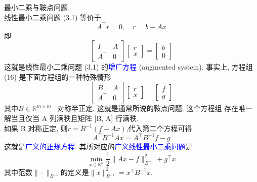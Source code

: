 \documentclass[12pt,a4paper]{article}
\begin{document}
最小二乘与鞍点问题\\
线性最小二乘问题 (3.1) 等价于
$$
A^{\top} r=0, \quad r=b-A x
$$
即
\begin{equation}
\left[\begin{array}{cc}{I} & {A} \\ {A^{\top}} & {0}\end{array}\right]\left[\begin{array}{l}{r} \\ {x}\end{array}\right]=\left[\begin{array}{l}{b} \\ {0}\end{array}\right]
\end{equation}
这就是线性最小二乘问题 (3.1) 的\textcolor{blue}{增广方程} (augmented system). 事实上,
方程组 (16) 是下面方程组的一种特殊情形
$$
\left[\begin{array}{cc}{B} & {A} \\ {A^{\top}} & {0}\end{array}\right]\left[\begin{array}{l}{r} \\ {x}\end{array}\right]=\left[\begin{array}{l}{f} \\ {g}\end{array}\right]
$$
其中$B \in \mathbb{R}^{m \times m}$ ~对称半正定. 这就是通常所说的鞍点问题. 这个方程组 存在唯一解当且仅当 A 列满秩且矩阵 [B, A] 行满秩.\\
如果 B 对称正定, 则$r=B^{-1}(f-A x)$,代入第二个方程可得
$$
A^{\top} B^{-1} A x=A^{\top} B^{-1} f-g
$$
这就是\textcolor{blue}{广义的正规方程}. 其所对应的\textcolor{blue}{广义线性最小二乘问题}是
$$
\min _{x \in \mathbb{R}^{n}} \frac{1}{2}\|A x-f\|_{B^{-1}}^{2}+g^{\top} x
$$
其中范数$\|\cdot\|_{B^{-1}}$的定义是$\|x\|_{B^{-1}}^{2}=x^{\top} B^{-1} x$.
\end{document}
